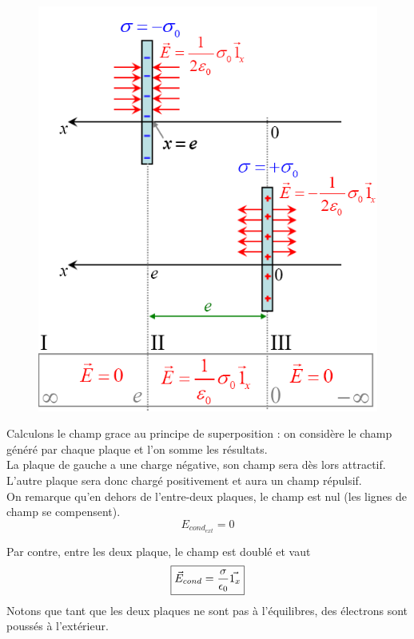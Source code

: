 \documentclass	[11pt, a4paper, openany]{book}
\begin{document}
\begin{figure}
\includegraphics[scale=0.44]{es/image15.png}
\end{figure}
Calculons le champ grace au principe de superposition : on considère le champ généré par chaque plaque et l'on somme les résultats.\\
La plaque de gauche a une charge négative, son champ sera dès lors attractif. L'autre plaque sera donc chargé positivement et aura un champ répulsif.\\
On remarque qu'en dehors de l'entre-deux plaques, le champ est nul (les lignes de champ se compensent).
\begin{equation}
E_{cond_{ext}} = 0
\end{equation}

Par contre, entre les deux plaque, le champ est doublé et vaut
\begin{equation}
\fbox{$\vec{E}_{cond} = \dfrac{\sigma}{\epsilon_0}\vec{1_x}$}
\end{equation}
Notons que tant que les deux plaques ne sont pas à l'équilibres, des électrons sont poussés à l'extérieur.\\
\end{document}
